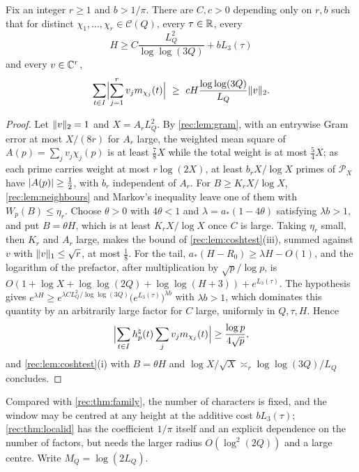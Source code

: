 \begin{theorem}\label{rec:thm:familytriple}
Fix an integer $r\ge1$ and $b>1/\pi$. There are $C,c>0$ depending only on $r,b$ such that for distinct
$\chi_1,\dots,\chi_r\in\mathcal C(Q)$, every $\tau\in\mathbb{R}$, every
\[
 H\ge C\frac{L_Q^2}{\log\log(3Q)}+bL_3(\tau)
\]
and every $v\in\mathbb{C}^r$,
\[
 \sum_{t\in I}\Bigl\lvert\sum_{j=1}^rv_jm_{\chi_j}(t)\Bigr\rvert\ \ge\ cH\frac{\log\log(3Q)}{L_Q}\norm v_2 .
\]
\end{theorem}

\begin{proof}
Let $\lVert v\rVert_2=1$ and $X=A_rL_Q^2$. By \cref{rec:lem:gram}, with an entrywise Gram error at most $X/(8r)$
for $A_r$ large, the weighted mean square of $A(p)=\sum_jv_j\chi_j(p)$ is at least $\tfrac78X$ while the
total weight is at most $\tfrac54X$; as each prime carries weight at most $r\log(2X)$, at least
$b_rX/\log X$ primes of $\mathcal P_X$ have $\lvert A(p)\rvert\ge\tfrac12$, with $b_r$ independent of $A_r$. For
$B\ge K_rX/\log X$, \cref{rec:lem:neighbours} and Markov's inequality leave one of them with
$W_p(B)\le\eta_r$. Choose $\theta>0$ with $4\theta<1$ and $\lambda=a_*(1-4\theta)$ satisfying $\lambda b>1$, and put
$B=\theta H$, which is at least $K_rX/\log X$ once $C$ is large. Taking $\eta_r$ small, then $K_r$ and $A_r$ large, makes the bound of
\cref{rec:lem:coshtest}(iii), summed against $v$ with $\lVert v\rVert_1\le\sqrt r$, at most $\tfrac18$. For the tail,
$a_*(H-R_0)\ge\lambda H-O(1)$, and the logarithm of the prefactor, after multiplication by $\sqrt p/\log p$, is
$O(1+\log X+\log\log(2Q)+\log\log(H+3))+e^{L_3(\tau)}$. The hypothesis gives
$e^{\lambda H}\ge e^{\lambda CL_Q^2/\log\log(3Q)}\bigl(e^{L_3(\tau)}\bigr)^{\lambda b}$ with $\lambda b>1$, which dominates this
quantity by an arbitrarily large factor for $C$ large, uniformly in $Q,\tau,H$. Hence
\begin{equation}\label{rec:eq:tripsep}
 \Bigl\lvert\sum_{t\in I}h_p^\natural(t)\sum_jv_jm_{\chi_j}(t)\Bigr\rvert\ge\frac{\log p}{4\sqrt p},
\end{equation}
and \cref{rec:lem:coshtest}(i) with $B=\theta H$ and $\log X/\sqrt X\asymp_r\log\log(3Q)/L_Q$ concludes.
\end{proof}

Compared with \cref{rec:thm:family}, the number of characters is fixed, and the window may be
centred at any height at the additive cost $bL_3(\tau)$; \cref{rec:thm:localid} has the coefficient
$1/\pi$ itself and an explicit dependence on the number of factors, but needs the larger radius
$O(\log^2(2Q))$ and a large centre. Write $M_Q=\log(2L_Q)$.

